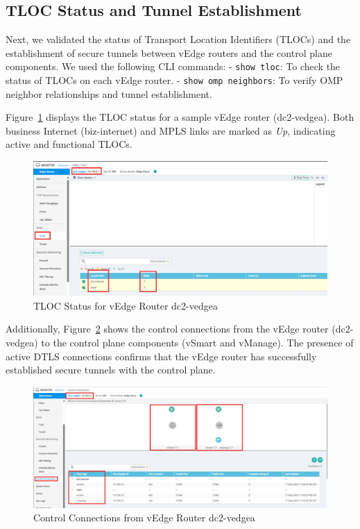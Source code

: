 \documentclass[12pt,english]{report}
\begin{document}
\subsection{TLOC Status and Tunnel Establishment}

Next, we validated the status of Transport Location Identifiers (TLOCs) and the establishment of secure tunnels between vEdge routers and the control plane components. We used the following CLI commands:
- \texttt{show tloc}: To check the status of TLOCs on each vEdge router.
- \texttt{show omp neighbors}: To verify OMP neighbor relationships and tunnel establishment.

Figure~\ref{fig:tloc_status} displays the TLOC status for a sample vEdge router (dc2-vedgea). Both business Internet (biz-internet) and MPLS links are marked as \textit{Up}, indicating active and functional TLOCs.

\begin{figure}[H]
    \centering
    \includegraphics[width=1\textwidth]{chapter 4/tloc-status.png}
    \caption{TLOC Status for vEdge Router dc2-vedgea}
    \label{fig:tloc_status}
\end{figure}

Additionally, Figure~\ref{fig:vedge_control_connections} shows the control connections from the vEdge router (dc2-vedgea) to the control plane components (vSmart and vManage). The presence of active DTLS connections confirms that the vEdge router has successfully established secure tunnels with the control plane.

\begin{figure}[H]
    \centering
    \includegraphics[width=1\textwidth]{chapter 4/control-conn-vedes.png}
    \caption{Control Connections from vEdge Router dc2-vedgea}
    \label{fig:vedge_control_connections}
\end{figure}
\end{document}
